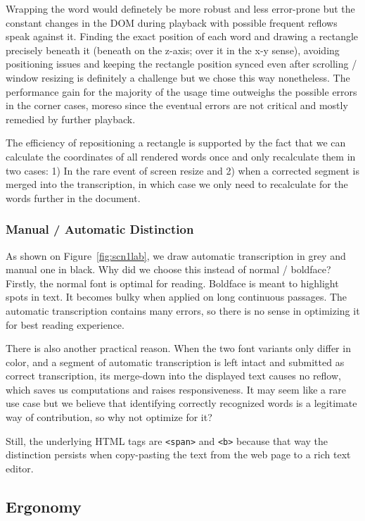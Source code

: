 \documentclass{svproc}
\begin{document}
Wrapping the word would definetely be more robust and less error-prone but the
constant changes in the DOM during playback with possible frequent reflows speak
against it. Finding the exact position of each word and drawing a rectangle
precisely beneath it (beneath on the z-axis; over it in the x-y sense), avoiding
positioning issues and keeping the rectangle position synced even after scrolling
/ window resizing is definitely a challenge but we chose this way nonetheless.
The performance gain for the majority of the usage time outweighs the possible
errors in the corner cases, moreso since the eventual errors are not critical
and mostly remedied by further playback.

The efficiency of repositioning a rectangle is supported by the fact that we can
calculate the coordinates of all rendered words once and only recalculate them
in two cases: 1) In the rare event of screen resize and 2) when a corrected
segment is merged into the transcription, in which case we only need to
recalculate for the words further in the document.

\subsubsection{Manual / Automatic Distinction}

As shown on Figure~\ref{fig:scn1lab}, we draw automatic transcription in grey
and manual one in black. Why did we choose this instead of normal / boldface?
Firstly, the normal font is optimal for reading. Boldface is meant to highlight
spots in text. It becomes bulky when applied on long continuous passages. The
automatic transcription contains many errors, so there is no sense in optimizing
it for best reading experience.

There is also another practical reason. When the two font variants only differ
in color, and a segment of automatic transcription is left intact and submitted
as correct transcription, its merge-down into the displayed text causes no
reflow, which saves us computations and raises responsiveness. It may seem like
a rare use case but we believe that identifying correctly recognized words is a
legitimate way of contribution, so why not optimize for it?

Still, the underlying HTML tags are \texttt{<span>} and \texttt{<b>} because
that way the distinction persists when copy-pasting the text from the web page
to a rich text editor.

\subsection{Ergonomy}
\end{document}
